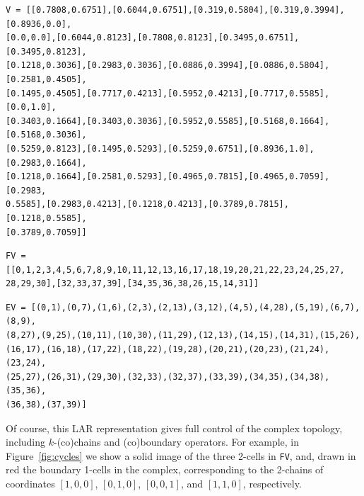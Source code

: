 \documentclass[11pt,oneside]{article}    %
\begin{document}
\begin{verbatim}
V = [[0.7808,0.6751],[0.6044,0.6751],[0.319,0.5804],[0.319,0.3994],[0.8936,0.0],
[0.0,0.0],[0.6044,0.8123],[0.7808,0.8123],[0.3495,0.6751],[0.3495,0.8123],
[0.1218,0.3036],[0.2983,0.3036],[0.0886,0.3994],[0.0886,0.5804],[0.2581,0.4505],
[0.1495,0.4505],[0.7717,0.4213],[0.5952,0.4213],[0.7717,0.5585],[0.0,1.0],
[0.3403,0.1664],[0.3403,0.3036],[0.5952,0.5585],[0.5168,0.1664],[0.5168,0.3036],
[0.5259,0.8123],[0.1495,0.5293],[0.5259,0.6751],[0.8936,1.0],[0.2983,0.1664],
[0.1218,0.1664],[0.2581,0.5293],[0.4965,0.7815],[0.4965,0.7059],[0.2983,
0.5585],[0.2983,0.4213],[0.1218,0.4213],[0.3789,0.7815],[0.1218,0.5585],
[0.3789,0.7059]]
\end{verbatim}

\begin{verbatim}
FV = [[0,1,2,3,4,5,6,7,8,9,10,11,12,13,16,17,18,19,20,21,22,23,24,25,27,
28,29,30],[32,33,37,39],[34,35,36,38,26,15,14,31]]
\end{verbatim}

\begin{verbatim}
EV = [(0,1),(0,7),(1,6),(2,3),(2,13),(3,12),(4,5),(4,28),(5,19),(6,7),(8,9),
(8,27),(9,25),(10,11),(10,30),(11,29),(12,13),(14,15),(14,31),(15,26),
(16,17),(16,18),(17,22),(18,22),(19,28),(20,21),(20,23),(21,24),(23,24),
(25,27),(26,31),(29,30),(32,33),(32,37),(33,39),(34,35),(34,38),(35,36),
(36,38),(37,39)]
\end{verbatim}

Of course, this LAR representation gives full control of the complex topology, including $k$-(co)chains and (co)boundary operators. For example, in Figure~\ref{fig:cycles} we show a solid image of the three 2-cells in \texttt{FV}, and, drawn in red the boundary 1-cells in the complex, corresponding to the 2-chains of coordinates $[1,0,0]$,  $[0,1,0]$, $[0,0,1]$, and $[1,1,0]$, respectively.
\end{document}
